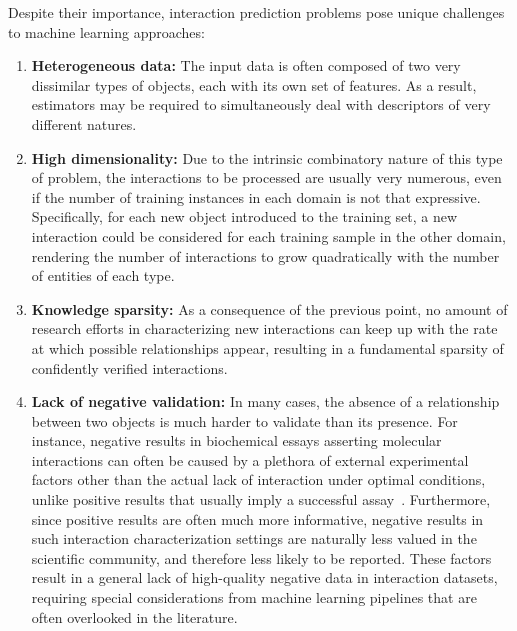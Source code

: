 Despite their importance, interaction prediction problems pose unique challenges to machine learning approaches:
%
\begin{enumerate}
    \item \textbf{Heterogeneous data:} The input data is often composed of two very dissimilar types of objects, each with its own set of features. As a result, estimators may be required to simultaneously deal with descriptors of very different natures.%
    \item \textbf{High dimensionality:} Due to the intrinsic combinatory nature of this type of problem, the interactions to be processed are usually very numerous, even if the number of training instances in each domain is not that expressive. Specifically, for each new object introduced to the training set, a new interaction could be considered for each training sample in the other domain, rendering the number of interactions to grow quadratically with the number of entities of each type.
    \item \textbf{Knowledge sparsity:} As a consequence of the previous point, no amount of research efforts in characterizing new interactions can keep up with the rate at which possible relationships appear, resulting in a fundamental sparsity of confidently verified interactions.
    \item \textbf{Lack of negative validation:} In many cases, the absence of a relationship between two objects is much harder to validate than its presence. For instance, negative results in biochemical essays asserting molecular interactions can often be caused by a plethora of external experimental factors other than the actual lack of interaction under optimal conditions, unlike positive results that usually imply a successful assay~\cite{}. Furthermore, since positive results are often much more informative, negative results in such interaction characterization settings are naturally less valued in the scientific community, and therefore less likely to be reported. These factors result in a general lack of high-quality negative data in interaction datasets, requiring special considerations from machine learning pipelines that are often overlooked in the literature.
\end{enumerate}

